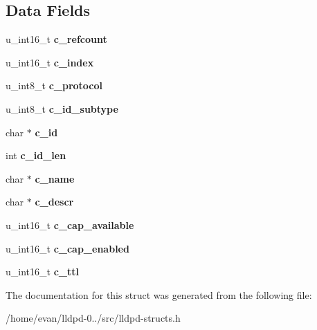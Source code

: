 \subsection*{\-Data \-Fields}
\begin{DoxyCompactItemize}
\item 
u\-\_\-int16\-\_\-t {\bfseries c\-\_\-refcount}\label{structlldpd__chassis_a283d979bf239bb685df6aeefb077ea49}

\item 
u\-\_\-int16\-\_\-t {\bfseries c\-\_\-index}\label{structlldpd__chassis_af9027ed0befea29d22e593916e7eb157}

\item 
u\-\_\-int8\-\_\-t {\bfseries c\-\_\-protocol}\label{structlldpd__chassis_ad7bff4dfb9591a74abb9e503e5888af1}

\item 
u\-\_\-int8\-\_\-t {\bfseries c\-\_\-id\-\_\-subtype}\label{structlldpd__chassis_a568f7d053cd71986ad935736d03b1b14}

\item 
char $\ast$ {\bfseries c\-\_\-id}\label{structlldpd__chassis_a1d197a5979713b299210b00c5f335962}

\item 
int {\bfseries c\-\_\-id\-\_\-len}\label{structlldpd__chassis_ad746c82b9193ce7a9f67cce2e68d3101}

\item 
char $\ast$ {\bfseries c\-\_\-name}\label{structlldpd__chassis_af7c81a6f1d004f4d724369fdbfaa2f6f}

\item 
char $\ast$ {\bfseries c\-\_\-descr}\label{structlldpd__chassis_af5726250a92508da7f60ebc6e4c86611}

\item 
u\-\_\-int16\-\_\-t {\bfseries c\-\_\-cap\-\_\-available}\label{structlldpd__chassis_af478c64bf5549efd88bfe8620a137182}

\item 
u\-\_\-int16\-\_\-t {\bfseries c\-\_\-cap\-\_\-enabled}\label{structlldpd__chassis_ad042f243c03eb9d675e733fa1230a523}

\item 
u\-\_\-int16\-\_\-t {\bfseries c\-\_\-ttl}\label{structlldpd__chassis_a7281471c96d3dd6e443d588f8d9e0827}

\end{DoxyCompactItemize}


\-The documentation for this struct was generated from the following file\-:\begin{DoxyCompactItemize}
\item 
/home/evan/lldpd-\/0../src/lldpd-\/structs.\-h\end{DoxyCompactItemize}
